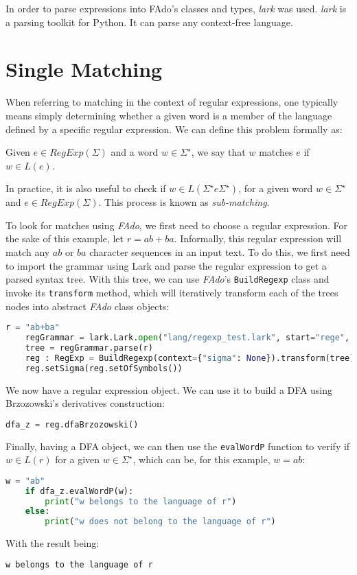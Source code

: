 In order to parse expressions into FAdo's classes and types, \emph{lark} was used. \emph{lark} \cite{lark_parser} is a parsing toolkit for Python. It can parse any context-free language.

\section{Single Matching}
When referring to matching in the context of regular expressions, one typically means simply determining whether a given word is a member of the language defined by a specific regular expression.
We can define this problem formally as:
\begin{defn}
	\label{defn:single_matching}
	Given $e \in RegExp(\Sigma)$ and a word $w \in \Sigma^\star$, we say that $w$ matches $e$ if $w \in L(e)$.
\end{defn}
In practice, it is also useful to check if $w \in L(\Sigma^\star e \Sigma^\star)$, for a given word $w \in \Sigma^\star$ and $e \in RegExp(\Sigma)$. This process is known as \textit{sub-matching}.

To look for matches using \textit{FAdo}, we first need to choose a regular expression. For the sake of this example, let $r = ab + ba$. Informally, this regular expression will match any $ab$ or $ba$ character sequences in an input text. To do this, we first need to import the grammar using Lark and parse the regular expression to get a parsed syntax tree. With this tree, we can use \textit{FAdo}'s \texttt{BuildRegexp} class and invoke its \texttt{transform} method, which will iteratively transform each of the trees nodes into abstract \textit{FAdo} class objects:
\begin{lstlisting}[language=Python]
	r = "ab+ba"
	regGrammar = lark.Lark.open("lang/regexp_test.lark", start="rege", parser="lalr")
	tree = regGrammar.parse(r)
	reg : RegExp = BuildRegexp(context={"sigma": None}).transform(tree)
	reg.setSigma(reg.setOfSymbols())
\end{lstlisting}
We now have a regular expression object. We can use it to build a DFA using Brzozowski's derivatives construction:
\begin{lstlisting}[language=Python]
	dfa_z = reg.dfaBrzozowski()
\end{lstlisting}
Finally, having a DFA object, we can then use the \texttt{evalWordP} function to verify if $w \in L(r)$ for a given $w \in \Sigma^\star$, which can be, for this example, $w = ab$:
\begin{lstlisting}[language=Python,label={code:eval_word_dfa}]
	w = "ab"
	if dfa_z.evalWordP(w):
		print("w belongs to the language of r")
	else:
		print("w does not belong to the language of r")
\end{lstlisting}
With the result being:
\begin{lstlisting}[language=Python]
	w belongs to the language of r
\end{lstlisting}
